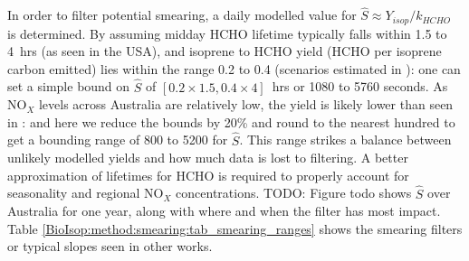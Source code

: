     
    
    In order to filter potential smearing, a daily modelled value for $\hat{S} \approx Y_{isop}/k_{HCHO}$ is determined.
    By assuming midday HCHO lifetime typically falls within 1.5 to 4~hrs (as seen in the USA), and isoprene to HCHO yield (HCHO per isoprene carbon emitted) lies within the range 0.2 to 0.4 (scenarios estimated in \textcite{Palmer2003}): one can set a simple bound on $\hat{S}$ of $[0.2 \times 1.5, 0.4 \times 4]$~hrs or 1080 to 5760 seconds.
    As NO$_X$ levels across Australia are relatively low, the yield is likely lower than seen in \textcite{Palmer2003}: and here we reduce the bounds by 20\% and round to the nearest hundred to get a bounding range of 800 to 5200 for $\hat{S}$. 
    This range strikes a balance between unlikely modelled yields and how much data is lost to filtering.
    A better approximation of lifetimes for HCHO is required to properly account for seasonality and regional NO$_X$ concentrations.
    TODO: Figure todo shows $\hat{S}$ over Australia for one year, along with where and when the filter has most impact.
    Table \ref{BioIsop:method:smearing:tab_smearing_ranges} shows the smearing filters or typical slopes seen in other works.
    
